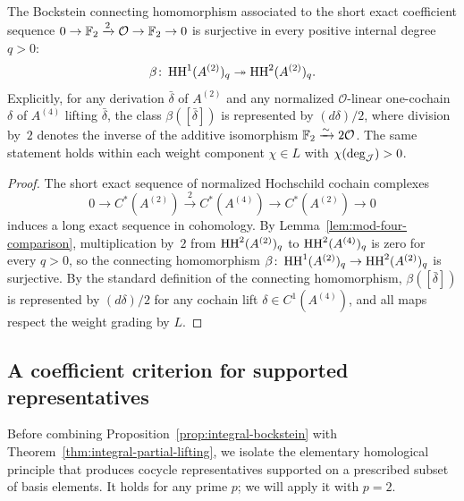 \begin{proposition}
\label{prop:integral-bockstein}
The Bockstein connecting homomorphism associated to the short exact coefficient sequence $0\to\mathbb F_2\xrightarrow{2}\mathcal O\to\mathbb F_2\to0$ is surjective in every positive internal degree $q>0$:
\[
  \beta\colon\operatorname{HH}^1(A^{(2)})_q\twoheadrightarrow\operatorname{HH}^2(A^{(2)})_q.
\]
Explicitly, for any derivation $\bar\delta$ of $A^{(2)}$ and any normalized $\mathcal O$-linear one-cochain $\delta$ of $A^{(4)}$ lifting $\bar\delta$, the class $\beta([\bar\delta])$ is represented by $(d\delta)/2$, where division by~$2$ denotes the inverse of the additive isomorphism $\mathbb F_2\xrightarrow{\sim}2\mathcal O$. The same statement holds within each weight component $\chi\in L$ with $\chi(\deg_\mathcal J)>0$.
\end{proposition}
\begin{proof}
The short exact sequence of normalized Hochschild cochain complexes
\[
  0\longrightarrow C^*(A^{(2)})\xrightarrow{\,2\,}C^*(A^{(4)})\longrightarrow C^*(A^{(2)})\longrightarrow0
\]
induces a long exact sequence in cohomology. By Lemma~\ref{lem:mod-four-comparison}, multiplication by~$2$ from $\operatorname{HH}^2(A^{(2)})_q$ to $\operatorname{HH}^2(A^{(4)})_q$ is zero for every $q>0$, so the connecting homomorphism $\beta\colon\operatorname{HH}^1(A^{(2)})_q\to\operatorname{HH}^2(A^{(2)})_q$ is surjective. By the standard definition of the connecting homomorphism, $\beta([\bar\delta])$ is represented by $(d\delta)/2$ for any cochain lift $\delta\in C^1(A^{(4)})$, and all maps respect the weight grading by $L$.
\end{proof}

\subsection{A coefficient criterion for supported representatives}

Before combining Proposition~\ref{prop:integral-bockstein} with Theorem~\ref{thm:integral-partial-lifting}, we isolate the elementary homological principle that produces cocycle representatives supported on a prescribed subset of basis elements. It holds for any prime $p$; we will apply it with $p=2$.

